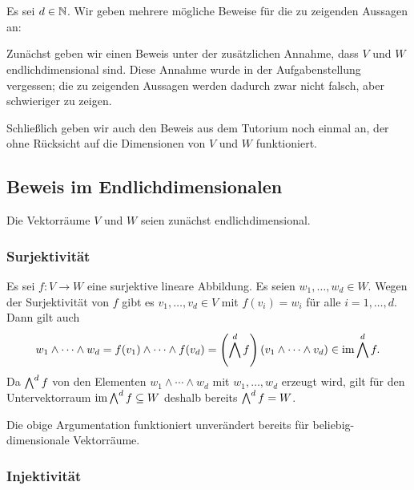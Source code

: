 \section{}
Es sei $d \in \mathbb{N}$.
Wir geben mehrere mögliche Beweise für die zu zeigenden Aussagen an:

Zunächst geben wir einen Beweis unter der zusätzlichen Annahme, dass $V$ und $W$ endlichdimensional sind.
Diese Annahme wurde in der Aufgabenstellung vergessen;
die zu zeigenden Aussagen werden dadurch zwar nicht falsch, aber schwieriger zu zeigen.

Schließlich geben wir auch den Beweis aus dem Tutorium noch einmal an, der ohne Rücksicht auf die Dimensionen von $V$ und $W$ funktioniert.





\subsection{Beweis im Endlichdimensionalen}

Die Vektorräume $V$ und $W$ seien zunächst endlichdimensional.



\subsubsection{Surjektivität}

Es sei $f \colon V \to W$ eine surjektive lineare Abbildung.
Es seien $w_1, \dotsc, w_d \in W$.
Wegen der Surjektivität von $f$ gibt es $v_1, \dotsc, v_d \in V$ mit $f(v_i) = w_i$ für alle $i = 1, \dotsc, d$.
Dann gilt auch
\[
      w_1 \wedge \dotsb \wedge w_d
  =   f(v_1) \wedge \dotsb \wedge f(v_d)
  =   \left( \bigwedge^{d} f \right)(v_1 \wedge \dotsb \wedge v_d)
  \in \operatorname{im} \bigwedge^{d} f.
\]
Da $\bigwedge^{d} f$ von den Elementen $w_1 \wedge \dotsb \wedge w_d$ mit $w_1, \dotsc, w_d$ erzeugt wird, gilt für den Untervektorraum $\operatorname{im} \bigwedge^{d} f \subseteq W$ deshalb bereits $\bigwedge^{d} f = W$.

\begin{remark}
  Die obige Argumentation funktioniert unverändert bereits für beliebig-di\-men\-si\-o\-na\-le Vektorräume.
\end{remark}



\subsubsection{Injektivität}

